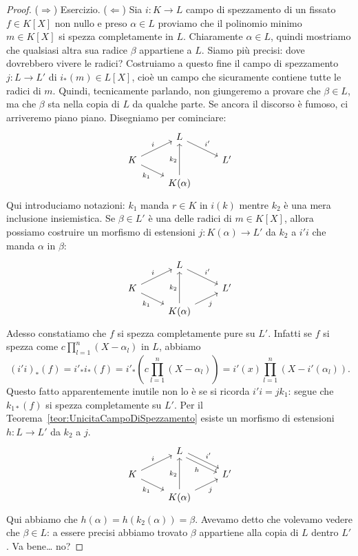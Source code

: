 \begin{proof}%
($\Rightarrow$) Esercizio.\newline
($\Leftarrow$) Sia $i : K \to L$ campo di spezzamento di un fissato $f \in K[X]$ non nullo e preso $\alpha \in L$ proviamo che il polinomio minimo $m \in K[X]$ si spezza completamente in $L$. Chiaramente $\alpha \in L$, quindi mostriamo che qualsiasi altra sua radice $\beta$ appartiene a $L$. Siamo più precisi: dove dovrebbero vivere le radici? Costruiamo a questo fine il campo di spezzamento $j : L \to L'$ di $i_\ast(m) \in L[X]$, cioè un campo che sicuramente contiene tutte le radici di $m$. Quindi, tecnicamente parlando, non giungeremo a provare che $\beta \in L$, ma che $\beta$ sta nella copia di $L$ da qualche parte. Se ancora il discorso è fumoso, ci arriveremo piano piano. Disegniamo per cominciare:
\[\begin{tikzcd}[row sep=small]
& L \ar["{i'}", dr] \\
K \ar["i", ur] \ar["{k_1}", dr, swap] &  & L' \\
& K(\alpha) \ar["{k_2}", uu]
\end{tikzcd}\]
Qui introduciamo notazioni: $k_1$ manda $r \in K$ in $i(k)$ mentre $k_2$ è una mera inclusione insiemistica. Se $\beta \in L'$ è una delle radici di $m \in K[X]$, allora possiamo costruire un morfismo di estensioni $j : K(\alpha) \to L'$ da $k_2$ a $i'i$ che manda $\alpha$ in $\beta$:
\[\begin{tikzcd}[row sep=small]
& L \ar["{i'}", dr] \\
K \ar["i", ur] \ar["{k_1}", dr, swap] &  & L' \\
& K(\alpha) \ar["{k_2}", uu] \ar["j", ur, swap]
\end{tikzcd}\]
Adesso constatiamo che $f$ si spezza completamente pure su $L'$. Infatti se $f$ si spezza come $c \prod_{l = 1}^n (X-\alpha_l)$ in $L$, abbiamo
\[\left(i'i\right)_\ast (f) = i'_\ast i_\ast (f) = i'_\ast \left(c \prod_{l = 1}^n (X-\alpha_l)\right) = i'(x) \prod_{l = 1}^n \left(X-i'(\alpha_l)\right) .\]
Questo fatto apparentemente inutile non lo è se si ricorda $i'i = jk_1$: segue che $k_{1\ast} (f)$ si spezza completamente su $L'$. Per il Teorema~\ref{teor:UnicitaCampoDiSpezzamento} esiste un morfismo di estensioni $h : L \to L'$ da $k_2$ a $j$.
\[\begin{tikzcd}[row sep=small]
& L \ar["{i'}", dr, shift left] \ar["h", dr, shift right, swap] \\
K \ar["i", ur] \ar["{k_1}", dr, swap] &  & L' \\
& K(\alpha) \ar["{k_2}", uu] \ar["j", ur, swap]
\end{tikzcd}\]
Qui abbiamo che $h(\alpha) = h\left(k_2 (\alpha)\right) = \beta$. Avevamo detto che volevamo vedere che $\beta \in L$: a essere precisi abbiamo trovato $\beta$ appartiene alla copia di $L$ dentro $L'$. Va bene\dots{} no?
\end{proof}

